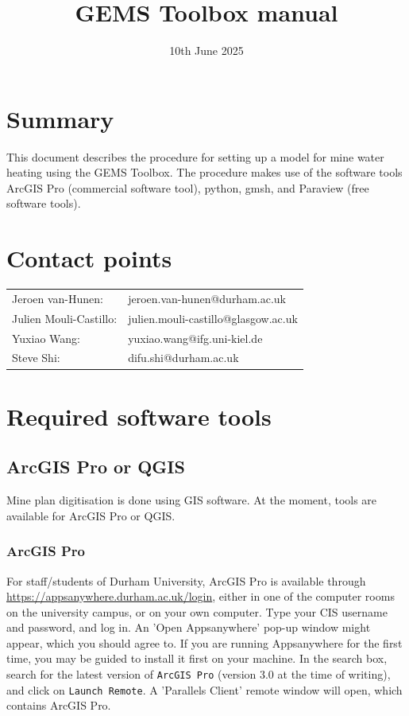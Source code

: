 


\title{GEMS Toolbox manual}
\author{}
\date{10th June 2025}

\maketitle

\tableofcontents

\section{Summary}
This document describes the procedure for setting up a model for mine water heating using the GEMS Toolbox. The procedure makes use of the software tools ArcGIS Pro (commercial software tool), python, gmsh, and Paraview (free software tools).

\section{Contact points}
\begin{tabular}{l l}
    Jeroen van-Hunen: &  jeroen.van-hunen@durham.ac.uk\\
    Julien Mouli-Castillo: & julien.mouli-castillo@glasgow.ac.uk\\
    Yuxiao Wang:& yuxiao.wang@ifg.uni-kiel.de\\
    Steve Shi: & difu.shi@durham.ac.uk
\end{tabular}

\section{Required software tools}
\subsection{ArcGIS Pro or QGIS}
Mine plan digitisation is done using GIS software. At the moment, tools are available for ArcGIS Pro or QGIS.
\subsubsection{ArcGIS Pro}
For staff/students of Durham University, ArcGIS Pro is available through \url{https://appsanywhere.durham.ac.uk/login}, either in one of the computer rooms on the university campus, or on your own computer. Type your CIS username and password, and log in. An 'Open Appsanywhere' pop-up window might appear, which you should agree to. If you are running Appsanywhere for the first time, you may be guided to install it first on your machine. In the search box, search for the latest version of {\tt ArcGIS Pro} (version 3.0 at the time of writing), and click on {\tt Launch Remote}. A 'Parallels Client' remote window will open, which contains ArcGIS Pro.

